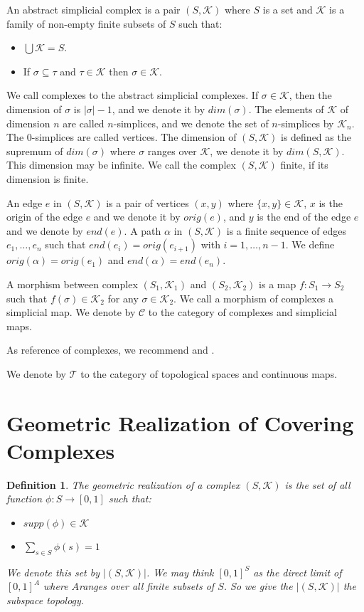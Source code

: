 \documentclass{amsart}
\newtheorem{definition}{Definition}[section]
\begin{document}
An abstract simplicial complex is a pair $(S,\mathcal{K})$ where $S$ is a set and $\mathcal{K}$ is a family of non-empty finite subsets of $S$ such that:
\begin{itemize}
\item $\bigcup\mathcal{K}=S$.
\item If $\sigma\subseteq \tau$ and $\tau\in \mathcal{K}$ then $\sigma\in\mathcal{K}$.
\end{itemize}
We call complexes to the abstract simplicial complexes.  If $\sigma\in \mathcal{K}$, then the dimension of $\sigma$ is $\vert\sigma\vert-1$, and we denote it by $dim(\sigma)$. The elements of $\mathcal{K}$ of dimension $n$ are called $n$-simplices, and we denote the set of $n$-simplices by $\mathcal{K}_n$. The $0$-simplices are called vertices. The dimension of $(S,\mathcal{K})$ is defined as the supremum of $dim(\sigma)$ where $\sigma$ ranges over $\mathcal{K}$, we denote it by $dim(S,\mathcal{K})$. This dimension may be infinite. We call the complex $(S,\mathcal{K})$  finite, if its dimension is finite.

An edge $e$ in $(S,\mathcal{K})$ is a pair of vertices  $(x,y)$ where $\{x,y\}\in\mathcal{K}$, $x$ is the origin of the edge $e$ and we denote it by $orig(e)$, and $y$ is the end of the edge $e$ and we denote by $end(e)$. A path $\alpha$ in $(S,\mathcal{K})$ is a finite sequence of edges $e_1,\dots,e_n$ such that $end(e_i)=orig(e_{i+1})$ with $i=1,\dots,n-1$. We define $orig(\alpha)=orig(e_1)$ and $end(\alpha)=end(e_n)$. 

A morphism between complex $(S_1,\mathcal{K}_1)$ and $(S_2,\mathcal{K}_2)$ is a map $f\colon S_1\longrightarrow S_2$ such that $f(\sigma)\in \mathcal{K}_2$ for any $\sigma\in\mathcal{K}_2$. We call a morphism of complexes a simplicial map. We  denote by $\mathcal{C}$ to the category of complexes and simplicial maps.

As reference of complexes, we recommend \cite{singer2015lecture}  and \cite{spanier1989algebraic}.

We  denote by $\mathcal{T}$ to the category of topological spaces and continuous maps.

\section{Geometric Realization of Covering Complexes}

\begin{definition}
The geometric realization of a complex $(S,\mathcal{K})$ is the set of all function $\phi\colon S\longrightarrow [0,1]$ such that:
\begin{itemize}
\item $supp(\phi)\in\mathcal{K}$
\item $\sum_{s\in S}\phi(s)=1$
\end{itemize}
We denote this set by $\vert (S,\mathcal{K})\vert$. We may think $[0,1]^S$ as the direct limit of $[0,1]^A$ where $A$ranges over all finite subsets of $S$. So we give the $\vert (S,\mathcal{K})\vert$ the subspace topology.
\end{definition}
\end{document}

